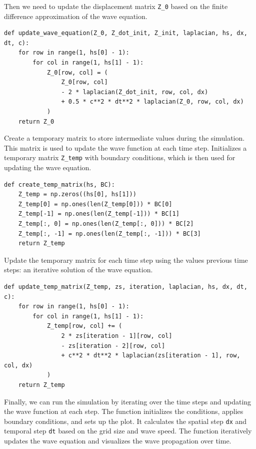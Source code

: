 \documentclass{article}
\begin{document}
Then we need to update the displacement matrix \texttt{Z\_0} based on the finite
difference approximation of the wave equation.

\begin{lstlisting}[style=Python, caption={Update Wave Equation}]
def update_wave_equation(Z_0, Z_dot_init, Z_init, laplacian, hs, dx, dt, c):
    for row in range(1, hs[0] - 1):
        for col in range(1, hs[1] - 1):
            Z_0[row, col] = (
                Z_0[row, col]
                - 2 * laplacian(Z_dot_init, row, col, dx)
                + 0.5 * c**2 * dt**2 * laplacian(Z_0, row, col, dx)
            )
    return Z_0
\end{lstlisting}

Create a temporary matrix to store intermediate values during the simulation.
This matrix is used to update the wave function at each time step. Initializes
a temporary matrix \texttt{Z\_temp} with boundary conditions, which is then used for
updating the wave equation.

\begin{lstlisting}[style=Python, caption={Create Temporary Matrix}]
def create_temp_matrix(hs, BC):
    Z_temp = np.zeros((hs[0], hs[1]))
    Z_temp[0] = np.ones(len(Z_temp[0])) * BC[0]
    Z_temp[-1] = np.ones(len(Z_temp[-1])) * BC[1]
    Z_temp[:, 0] = np.ones(len(Z_temp[:, 0])) * BC[2]
    Z_temp[:, -1] = np.ones(len(Z_temp[:, -1])) * BC[3]
    return Z_temp
\end{lstlisting}

Update the temporary matrix for each time step using the values previous time
steps: an iterative solution of the wave equation.

\begin{lstlisting}[style=Python, caption={Update Temporary Matrix}]
def update_temp_matrix(Z_temp, zs, iteration, laplacian, hs, dx, dt, c):
    for row in range(1, hs[0] - 1):
        for col in range(1, hs[1] - 1):
            Z_temp[row, col] += (
                2 * zs[iteration - 1][row, col]
                - zs[iteration - 2][row, col]
                + c**2 * dt**2 * laplacian(zs[iteration - 1], row, col, dx)
            )
    return Z_temp
\end{lstlisting}

Finally, we can run the simulation by iterating over the time steps and
updating the wave function at each step. The function initializes the
conditions, applies boundary conditions, and sets up the plot. It calculates
the spatial step \texttt{dx} and temporal step \texttt{dt} based on the grid
size and wave speed. The function iteratively updates the wave equation and
visualizes the wave propagation over time.
\end{document}
